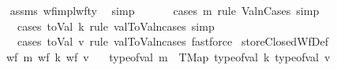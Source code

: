 \begin{isabellebody}
%
\isadelimproof
\ \ %
\endisadelimproof
%
\isatagproof
{}\isamarkupfalse%
\ assms\ wf{\isacharunderscore}{\kern0pt}impl{\isacharunderscore}{\kern0pt}wf{\isacharunderscore}{\kern0pt}ty\ \isamarkupfalse%
\ simp\isanewline
\ \ \isanewline
\ \ \isamarkupfalse%
\ {\isacharparenleft}{\kern0pt}cases\ m\ rule{\isacharcolon}{\kern0pt}\ ValnCases{\isacharsemicolon}{\kern0pt}\ simp{\isacharsemicolon}{\kern0pt}\isanewline
\ \ \ \ \ cases\ {\isachardoublequoteopen}{\isacharparenleft}{\kern0pt}toVal{}{}{}{}\ k{\isacharparenright}{\kern0pt}{\isachardoublequoteclose}\ rule{\isacharcolon}{\kern0pt}\ val{}ToValn{\isachardot}{\kern0pt}cases{\isacharsemicolon}{\kern0pt}\ simp{\isacharsemicolon}{\kern0pt}\isanewline
\ \ \ \ \ cases\ {\isachardoublequoteopen}{\isacharparenleft}{\kern0pt}toVal{}{}{}{}\ v{\isacharparenright}{\kern0pt}{\isachardoublequoteclose}\ rule{\isacharcolon}{\kern0pt}\ val{}ToValn{\isachardot}{\kern0pt}cases{\isacharsemicolon}{\kern0pt}\ fastforce{\isacharparenright}{\kern0pt}%
\endisatagproof
{\isafoldproof}%
%
\isadelimproof
\isanewline
%
\endisadelimproof
\isanewline
\isanewline
{}\isamarkupfalse%
\ storeClosedWfDef{\isacharcolon}{\kern0pt}\isanewline
\ \ \ {\isachardoublequoteopen}wf\ m{\isachardoublequoteclose}\ {\isachardoublequoteopen}wf\ k{\isacharprime}{\kern0pt}{\isachardoublequoteclose}\ {\isachardoublequoteopen}wf\ v{\isachardoublequoteclose}\isanewline
\ \ \ {\isachardoublequoteopen}type{\isacharunderscore}{\kern0pt}of{\isacharunderscore}{\kern0pt}val\ m\ {\isacharequal}{\kern0pt}\ TMap\ {\isacharparenleft}{\kern0pt}type{\isacharunderscore}{\kern0pt}of{\isacharunderscore}{\kern0pt}val\ k{\isacharprime}{\kern0pt}{\isacharparenright}{\kern0pt}\ {\isacharparenleft}{\kern0pt}type{\isacharunderscore}{\kern0pt}of{\isacharunderscore}{\kern0pt}val\ v{\isacharparenright}{\kern0pt}{\isachardoublequoteclose}\isanewline

\end{isabellebody}
